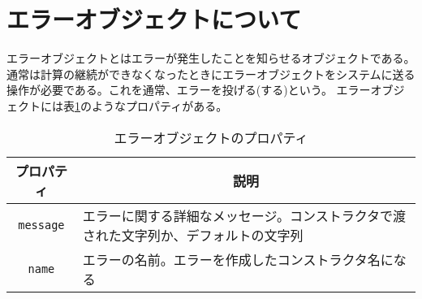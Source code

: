 \section{エラーオブジェクトについて}
エラーオブジェクトとはエラーが発生したことを知らせるオブジェクトである。
通常は計算の継続ができなくなったときにエラーオブジェクトをシステムに送る
操作が必要である。これを通常、エラーを投げる(する)という。
エラーオブジェクトには表\ref{ErrorProp}のようなプロパティがある。
\begin{table}
 \caption{エラーオブジェクトのプロパティ}\label{ErrorProp}
 \begin{center}
	 \begin{tabular}{|c|m{}|}\hline
		プロパティ&\multicolumn{1}{c|}{説明}\\ \hline
		\texttt{message}&エラーに関する詳細なメッセージ。コンストラクタで渡
				された文字列か、デフォルトの文字列\\ \hline
		\texttt{name}&エラーの名前。エラーを作成したコンストラクタ名になる\\ \hline

	\end{tabular}
 \end{center}
\end{table}
